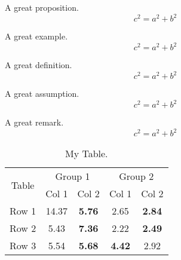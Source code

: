 \begin{proposition}[My proposition]
	A great proposition.
	\begin{equation}
		c^2=a^2+b^2
	\end{equation}
\end{proposition}

\begin{example}[My example]
	A great example.
	\begin{equation}
		c^2=a^2+b^2
	\end{equation}
\end{example}

\begin{definition}[My definition]
	A great definition.
	\begin{equation}
		c^2=a^2+b^2
	\end{equation}
\end{definition}

\begin{assumption}[My assumption]
	A great assumption.
	\begin{equation}
		c^2=a^2+b^2
	\end{equation}
\end{assumption}

\begin{remark}[My remark]
	A great remark.
	\begin{equation}
		c^2=a^2+b^2
	\end{equation}
\end{remark}



\begin{table}
	\centering
	\begin{tabular}{ccccc}\toprule
		\multirow{2}{*}{Table}  & \multicolumn{2}{c}{Group 1}   & \multicolumn{2}{c}{Group 2}\\
		& Col 1   &  Col 2 & Col 1   &  Col 2 \\\midrule
		Row 1 & 14.37 & \textbf{5.76} & 2.65 & \textbf{2.84}\\
		Row 2   & 5.43 & \textbf{7.36}     & 2.22 & \textbf{2.49}\\ 
		Row 3 & 5.54 & \textbf{5.68}   & \textbf{4.42} &  2.92\\
		\bottomrule
	\end{tabular}
	\caption{My Table.}
	\label{tab:mytable}
\end{table}